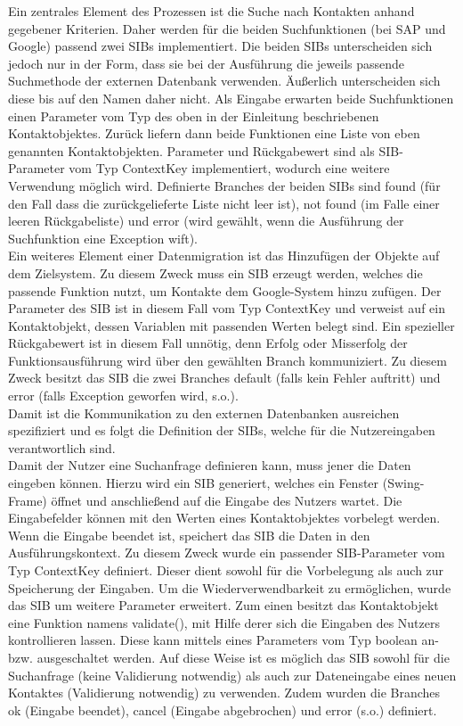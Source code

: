 Ein zentrales Element des Prozessen ist die Suche nach Kontakten anhand gegebener Kriterien. Daher werden für die beiden Suchfunktionen (bei SAP und Google) passend zwei SIBs implementiert. Die beiden SIBs unterscheiden sich jedoch nur in der Form, dass sie bei der Ausführung die jeweils passende Suchmethode der externen Datenbank verwenden. Äußerlich unterscheiden sich diese bis auf den Namen daher nicht. Als Eingabe erwarten beide Suchfunktionen einen Parameter vom Typ des oben in der Einleitung beschriebenen Kontaktobjektes. Zurück liefern dann beide Funktionen eine Liste von eben genannten Kontaktobjekten. Parameter und Rückgabewert sind als SIB-Parameter vom Typ ContextKey implementiert, wodurch eine weitere Verwendung möglich wird. Definierte Branches der beiden SIBs sind found (für den Fall dass die zurückgelieferte Liste nicht leer ist), not found (im Falle einer leeren Rückgabeliste) und error (wird gewählt, wenn die Ausführung der Suchfunktion eine Exception wift).\\

Ein weiteres Element einer Datenmigration ist das Hinzufügen der Objekte auf dem Zielsystem. Zu diesem Zweck muss ein SIB erzeugt werden, welches die passende Funktion nutzt, um Kontakte dem Google-System hinzu zufügen. Der Parameter des SIB ist in diesem Fall vom Typ ContextKey und verweist auf ein Kontaktobjekt, dessen Variablen mit passenden Werten belegt sind. Ein spezieller Rückgabewert ist in diesem Fall unnötig, denn Erfolg oder Misserfolg der Funktionsausführung wird über den gewählten Branch kommuniziert. Zu diesem Zweck besitzt das SIB die zwei Branches default (falls kein Fehler auftritt) und error (falls Exception geworfen wird, s.o.).\\

Damit ist die Kommunikation zu den externen Datenbanken ausreichen spezifiziert und es folgt die Definition der SIBs, welche für die Nutzereingaben verantwortlich sind.\\

Damit der Nutzer eine Suchanfrage definieren kann, muss jener die Daten eingeben können. Hierzu wird ein SIB generiert, welches ein Fenster (Swing-Frame) öffnet und anschließend auf die Eingabe des Nutzers wartet. Die Eingabefelder können mit den Werten eines Kontaktobjektes vorbelegt werden. Wenn die Eingabe beendet ist, speichert das SIB die Daten in den Ausführungskontext. Zu diesem Zweck wurde ein passender SIB-Parameter vom Typ ContextKey definiert. Dieser dient sowohl für die Vorbelegung als auch zur Speicherung der Eingaben. Um die Wiederverwendbarkeit zu ermöglichen, wurde das SIB um weitere Parameter erweitert. Zum einen besitzt das Kontaktobjekt eine Funktion namens validate(), mit Hilfe derer sich die Eingaben des Nutzers kontrollieren lassen. Diese kann mittels eines Parameters vom Typ boolean an- bzw. ausgeschaltet werden. Auf diese Weise ist es möglich das SIB sowohl für die Suchanfrage (keine Validierung notwendig) als auch zur Dateneingabe eines neuen Kontaktes (Validierung notwendig) zu verwenden. Zudem wurden die Branches ok (Eingabe beendet), cancel (Eingabe abgebrochen) und error (s.o.) definiert.\\

